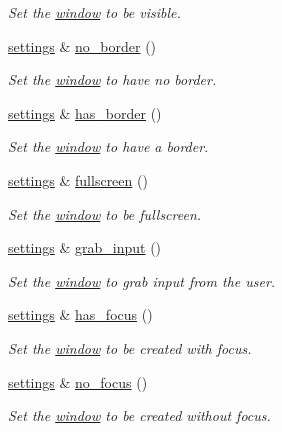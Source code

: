 \begin{DoxyCompactItemize}
\begin{DoxyCompactList}\small\item\em Set the \hyperlink{classgfx_1_1window}{window} to be visible. \end{DoxyCompactList}\item 
\hyperlink{classgfx_1_1window_1_1settings}{settings} \& \hyperlink{classgfx_1_1window_1_1settings_a373fb308f3e6a4298cb8bb9e03c43d1e}{no\-\_\-border} ()
\begin{DoxyCompactList}\small\item\em Set the \hyperlink{classgfx_1_1window}{window} to have no border. \end{DoxyCompactList}\item 
\hyperlink{classgfx_1_1window_1_1settings}{settings} \& \hyperlink{classgfx_1_1window_1_1settings_ac2e3e243a7f91fe585416b33a41063eb}{has\-\_\-border} ()
\begin{DoxyCompactList}\small\item\em Set the \hyperlink{classgfx_1_1window}{window} to have a border. \end{DoxyCompactList}\item 
\hyperlink{classgfx_1_1window_1_1settings}{settings} \& \hyperlink{classgfx_1_1window_1_1settings_adb369a3881bcf9043e1666ee75ec227b}{fullscreen} ()
\begin{DoxyCompactList}\small\item\em Set the \hyperlink{classgfx_1_1window}{window} to be fullscreen. \end{DoxyCompactList}\item 
\hypertarget{classgfx_1_1window_1_1settings_a6858bedadb73ea420c548d9f0ac0a2ae}{\hyperlink{classgfx_1_1window_1_1settings}{settings} \& \hyperlink{classgfx_1_1window_1_1settings_a6858bedadb73ea420c548d9f0ac0a2ae}{grab\-\_\-input} ()}\label{classgfx_1_1window_1_1settings_a6858bedadb73ea420c548d9f0ac0a2ae}

\begin{DoxyCompactList}\small\item\em Set the \hyperlink{classgfx_1_1window}{window} to grab input from the user. \end{DoxyCompactList}\item 
\hyperlink{classgfx_1_1window_1_1settings}{settings} \& \hyperlink{classgfx_1_1window_1_1settings_ad07cf74dbdabb1c4c433e2ca2b66dbd2}{has\-\_\-focus} ()
\begin{DoxyCompactList}\small\item\em Set the \hyperlink{classgfx_1_1window}{window} to be created with focus. \end{DoxyCompactList}\item 
\hyperlink{classgfx_1_1window_1_1settings}{settings} \& \hyperlink{classgfx_1_1window_1_1settings_ac96e076a6d7e1003c40931a03be1b7fc}{no\-\_\-focus} ()
\begin{DoxyCompactList}\small\item\em Set the \hyperlink{classgfx_1_1window}{window} to be created without focus. \end{DoxyCompactList}\end{DoxyCompactItemize}
